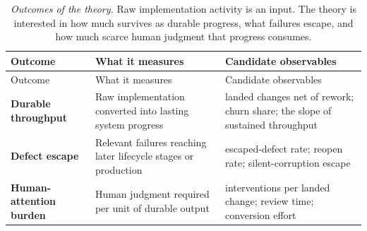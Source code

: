 {\footnotesize
\begin{longtable}[]{@{}
  >{\raggedright\arraybackslash}p{}
  >{\raggedright\arraybackslash}p{}
  >{\raggedright\arraybackslash}p{}@{}}
\caption[The three MAGE outcomes and their observables]{\emph{Outcomes of the theory.} Raw implementation activity is an input. The theory is interested in how much survives as durable progress, what failures escape, and how much scarce human judgment that progress consumes.}\label{mage-outcomes}\tabularnewline
\toprule\noalign{}
\begin{minipage}[b]{\linewidth}\raggedright
Outcome
\end{minipage} & \begin{minipage}[b]{\linewidth}\raggedright
What it measures
\end{minipage} & \begin{minipage}[b]{\linewidth}\raggedright
Candidate observables
\end{minipage} \\
\midrule\noalign{}
\endfirsthead
\toprule\noalign{}
\begin{minipage}[b]{\linewidth}\raggedright
Outcome
\end{minipage} & \begin{minipage}[b]{\linewidth}\raggedright
What it measures
\end{minipage} & \begin{minipage}[b]{\linewidth}\raggedright
Candidate observables
\end{minipage} \\
\midrule\noalign{}
\endhead
\bottomrule\noalign{}
\endlastfoot
\textbf{Durable throughput} & Raw implementation converted into lasting system progress & landed changes net of rework; churn share; the slope of sustained throughput \\
\textbf{Defect escape} & Relevant failures reaching later lifecycle stages or production & escaped-defect rate; reopen rate; silent-corruption escape \\
\textbf{Human-attention burden} & Human judgment required per unit of durable output & interventions per landed change; review time; conversion effort \\
\end{longtable}
}


